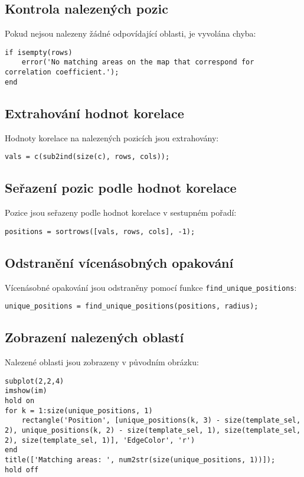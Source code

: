 \subsection*{Kontrola nalezených pozic}
Pokud nejsou nalezeny žádné odpovídající oblasti, je vyvolána chyba:
\begin{verbatim}
if isempty(rows)
    error('No matching areas on the map that correspond for correlation coefficient.');
end
\end{verbatim}

\subsection*{Extrahování hodnot korelace}
Hodnoty korelace na nalezených pozicích jsou extrahovány:
\begin{verbatim}
vals = c(sub2ind(size(c), rows, cols));
\end{verbatim}

\subsection*{Seřazení pozic podle hodnot korelace}
Pozice jsou seřazeny podle hodnot korelace v sestupném pořadí:
\begin{verbatim}
positions = sortrows([vals, rows, cols], -1);
\end{verbatim}

\subsection*{Odstranění vícenásobných opakování}
Vícenásobné opakování jsou odstraněny pomocí funkce \texttt{find\_unique\_positions}:
\begin{verbatim}
unique_positions = find_unique_positions(positions, radius);
\end{verbatim}

\subsection*{Zobrazení nalezených oblastí}
Nalezené oblasti jsou zobrazeny v původním obrázku:
\begin{verbatim}
subplot(2,2,4)
imshow(im)
hold on
for k = 1:size(unique_positions, 1)
    rectangle('Position', [unique_positions(k, 3) - size(template_sel, 2), unique_positions(k, 2) - size(template_sel, 1), size(template_sel, 2), size(template_sel, 1)], 'EdgeColor', 'r')
end
title(['Matching areas: ', num2str(size(unique_positions, 1))]);
hold off
\end{verbatim}

